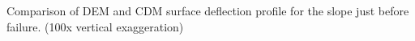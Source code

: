 \label{fig:surfacedeflection} Comparison of DEM and CDM surface deflection profile for the slope just before failure. (100x vertical exaggeration)
